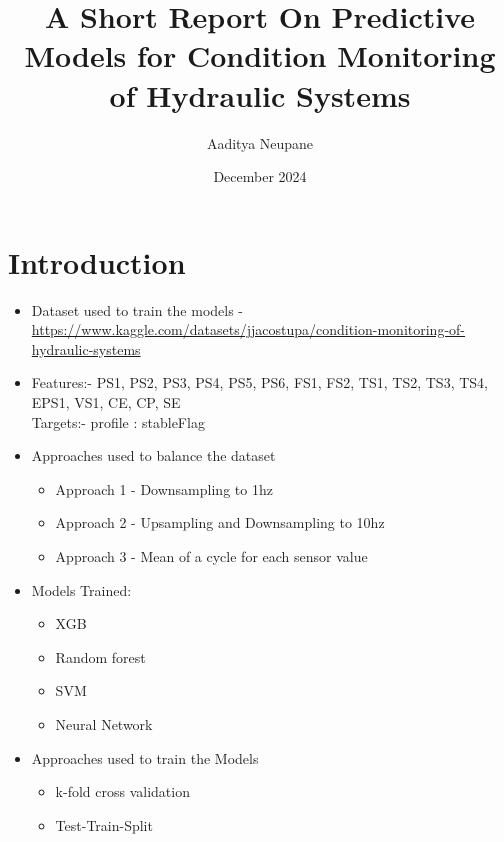 \documentclass{article}
\title{A Short Report On Predictive Models for Condition Monitoring of Hydraulic Systems }
\author{Aaditya Neupane}
\date{December 2024}
\begin{document}
\maketitle

\section{Introduction}
\begin{itemize}
    \item Dataset used to train the models - 
    \href{https://www.kaggle.com/datasets/jjacostupa/condition-monitoring-of-hydraulic-systems}{https://www.kaggle.com/datasets/jjacostupa/condition-monitoring-of-hydraulic-systems}  %
    \item Features:- PS1, PS2, PS3, PS4, PS5, PS6, FS1, FS2, TS1, TS2, TS3, TS4, EPS1, VS1, CE, CP, SE
    \\
    Targets:- profile : stableFlag
    \\
    \item Approaches used to balance the dataset 
            \begin{itemize}
                \item Approach 1 - Downsampling to 1hz
                \item Approach 2 - Upsampling and Downsampling to 10hz
                \item Approach 3 - Mean of a cycle for each sensor value
            \end{itemize}

    \item Models Trained:
            \begin{itemize}
                \item XGB
                \item Random forest
                \item SVM
                \item Neural Network
            \end{itemize}

    \item Approaches used to train the Models 
        \begin{itemize}
            \item k-fold cross validation
            \item Test-Train-Split
        \end{itemize}


\end{itemize}
\vspace{1cm}
\end{document}
